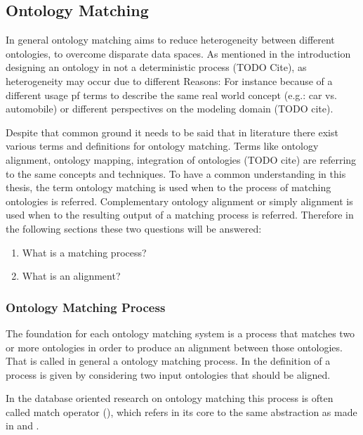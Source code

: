 \documentclass[11pt,titlepage,oneside,openany,a4paper]{report}
\begin{document}
\subsection{Ontology Matching}
\label{sec:ontologymatching_def}
In general ontology matching aims to reduce heterogeneity between different ontologies, to overcome disparate data spaces. As mentioned in the introduction designing an ontology in not a deterministic process (TODO Cite), as heterogeneity may occur due to different Reasons: For instance because of a different usage pf terms to describe the same real world concept (e.g.: car vs. automobile)  or different perspectives on the modeling domain (TODO cite). 

	Despite that common ground it needs to be said that in literature there exist various terms and definitions for ontology matching. Terms like ontology alignment, ontology mapping, integration of ontologies (TODO cite) are referring to the same concepts and techniques. To have a common understanding in this thesis, the term ontology matching is used when to the process of matching ontologies is referred. Complementary ontology alignment or simply alignment is used when to the resulting output of a matching process is referred. Therefore in the following sections these two questions will be answered:
	
\begin{enumerate}
\item What is a matching process?
\item What is an alignment?
\end{enumerate}

\subsubsection{Ontology Matching Process}
\label{sec:om_process}
The foundation for each ontology matching system is a process that matches two or more ontologies in order to produce an alignment between those ontologies. That is called in general a ontology matching process. In the definition of a process is given by considering two input ontologies that should be aligned.

In the database oriented research on ontology matching this process is often called match operator (\cite{Rahm:2001}), which refers in its core to the same abstraction as made in \cite{euzenat2013d} and  \cite{ehrig2006ontology}.
\end{document}
